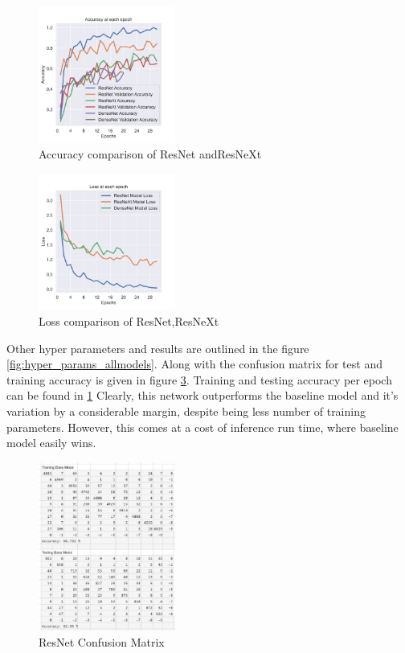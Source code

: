 \documentclass[conference]{IEEEtran}
\begin{document}
	
		\begin{figure}
			\centering
			\includegraphics[width=0.4\textwidth]{compare_graphs/resnet_accuracy_compare.png}
			\caption{Accuracy comparison of ResNet andResNeXt}
			\label{fig:resnet_accuracy_compare}
		\end{figure}
	
		\begin{figure}
			\centering
			\includegraphics[width=0.4\textwidth]{compare_graphs/resnet_loss_compare.png}
			\caption{Loss comparison of ResNet,ResNeXt}
			\label{fig:resnet_loss_compare}
		\end{figure}
	
	
		Other hyper parameters and results are outlined in the figure \ref{fig:hyper_params_allmodels}. Along with the confusion matrix for test and training accuracy is given in figure \ref{fig:resnet_cm}. Training and testing accuracy per epoch can be found in \ref{fig:resnet_accuracy_compare} Clearly, this network outperforms the baseline model and it's variation by a considerable margin, despite being less number of training parameters. However, this comes at a cost of inference run time, where baseline model easily wins.
				
	
		

		\begin{figure}
			\centering
			\includegraphics[width=0.4\textwidth]{CM/resnet.png}
			\caption{ResNet Confusion Matrix}
			\label{fig:resnet_cm}
		\end{figure}
	
\end{document}
